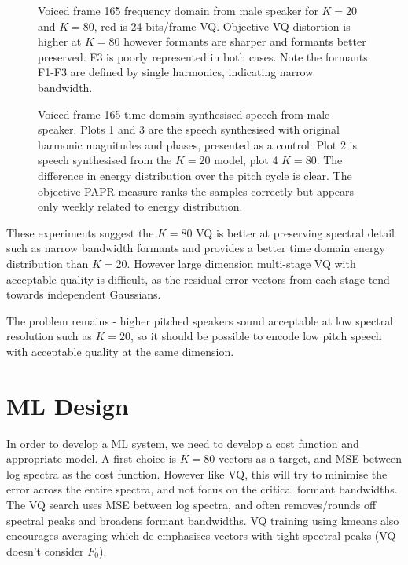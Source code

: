 \documentclass{article}
\begin{document}
\begin{figure}
\caption{Voiced frame 165 frequency domain from male speaker for $K=20$ and $K=80$, red is 24 bits/frame VQ. Objective VQ distortion is higher at $K=80$ however formants are sharper and formants better preserved.  F3 is poorly represented in both cases.  Note the formants F1-F3 are defined by single harmonics, indicating narrow bandwidth.}
\label{fig:big_dog_f165_freq}
\begin{center}


\end{center}
\end{figure}

\begin{figure}
\caption{Voiced frame 165 time domain synthesised speech from male speaker.  Plots 1 and 3 are the speech synthesised with original harmonic magnitudes and phases, presented as a control.  Plot 2 is speech synthesised from the $K=20$ model, plot 4 $K=80$. The difference in energy distribution over the pitch cycle is clear.  The objective PAPR measure ranks the samples correctly but appears only weekly related to energy distribution.}
\label{fig:big_dog_f165_time}
\begin{center}


\end{center}
\end{figure}

These experiments suggest the $K=80$ VQ is better at preserving spectral detail such as narrow bandwidth formants and provides a better time domain energy distribution than $K=20$.  However large dimension multi-stage VQ with acceptable quality is difficult, as the residual error vectors from each stage tend towards independent Gaussians.

The problem remains - higher pitched speakers sound acceptable at low spectral resolution such as $K=20$, so it should be possible to encode low pitch speech with acceptable quality at the same dimension.

\section{ML Design}

In order to develop a ML system, we need to develop a cost function and appropriate model.  A first choice is $K=80$ vectors as a target, and MSE between log spectra as the cost function.  However like VQ, this will try to minimise the error across the entire spectra, and not focus on the critical formant bandwidths.  The VQ search uses MSE between log spectra, and often removes/rounds off spectral peaks and broadens formant bandwidths.  VQ training using kmeans also encourages averaging which de-emphasises vectors with tight spectral peaks (VQ doesn't consider $F_0$).
\end{document}
